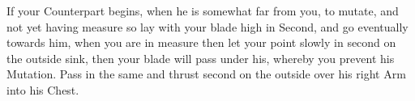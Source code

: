 \exercise {}

If your Counterpart begins, when he is somewhat far from you, to
mutate, and not yet having measure so lay with your blade high in
Second, and go eventually towards him, when you are in measure then
let your point slowly in second on the outside sink, then your blade
will pass under his, whereby you prevent his Mutation. Pass in the
same and thrust second on the outside over his right Arm into his
Chest.
